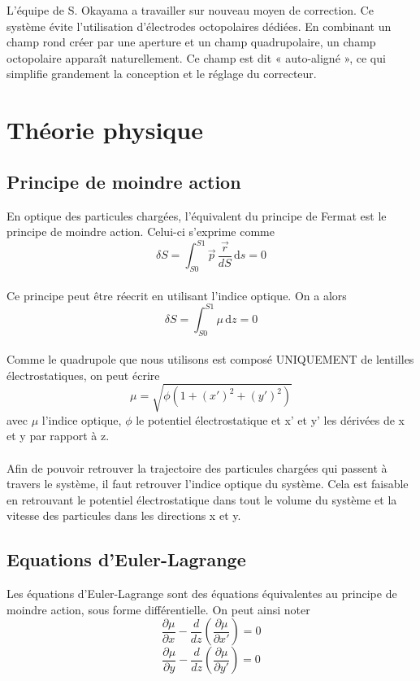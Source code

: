 \documentclass[a4paper]{report}
\begin{document}
L'équipe de S. Okayama a travailler sur nouveau moyen de correction. Ce système évite l'utilisation d'électrodes octopolaires dédiées. 
En combinant un champ rond créer par une aperture et un champ quadrupolaire, un champ octopolaire apparaît naturellement. 
Ce champ est dit « auto-aligné », ce qui simplifie grandement la conception et le réglage du correcteur.


\chapter{Théorie physique}
\section{Principe de moindre action}
En optique des particules chargées, l'équivalent du principe de Fermat est le principe de moindre action.
Celui-ci s'exprime comme 
\[
\delta S = \int_{S0}^{S1} \vec{p}\,\frac{\vec{r}}{dS} \, \mathrm{d}s = 0
\]
\\
Ce principe peut être réecrit en utilisant l'indice optique. On a alors 
\[
\delta S = \int_{S0}^{S1} \mu\,\mathrm{d}z = 0
\]
\\
Comme le quadrupole que nous utilisons est composé UNIQUEMENT de lentilles électrostatiques, on peut écrire
\[
\mu = \sqrt{\phi(1+(x')^2 + (y')^2)}
\]
avec $\mu$ l'indice optique, $\phi$ le potentiel électrostatique et x' et y' les dérivées de x et y par
rapport à z.
\\
\\
Afin de pouvoir retrouver la trajectoire des particules chargées qui passent à travers le système, il faut 
retrouver l'indice optique du système. Cela est faisable en retrouvant le potentiel électrostatique dans tout le volume du
système et la vitesse des particules dans les directions x et y. 

\section{Equations d'Euler-Lagrange}
Les équations d'Euler-Lagrange sont des équations équivalentes au principe de moindre action, sous forme 
différentielle. On peut ainsi noter 
\[
\frac{\partial \mu }{\partial x}-\frac{d}{dz}\left(\frac{\partial \mu }{\partial x'}\right)=0
\]
\[
\frac{\partial \mu }{\partial y}-\frac{d}{dz}\left(\frac{\partial \mu }{\partial y'}\right)=0
\]
\end{document}
